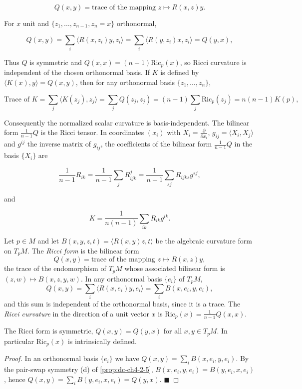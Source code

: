 $$
Q(x,y)=\text{trace of the mapping }z\mapsto R(x,z)y.
$$

For $x$ unit and $\{z_1,\dots,z_{n-1},z_n=x\}$ orthonormal,

$$
Q(x,y)=\sum_i\langle R(x,z_i)y,z_i\rangle=\sum_i\langle R(y,z_i)x,z_i\rangle=Q(y,x),
$$

Thus $Q$ is symmetric and $Q(x,x)=(n-1)\mathrm{Ric}_p(x)$, so Ricci curvature is
independent of the chosen orthonormal basis. If $K$ is defined by
$\langle K(x),y\rangle=Q(x,y)$, then for any orthonormal basis
$\{z_1,\dots,z_n\}$,

$$
\text{Trace of }K=\sum_j\langle K(z_j),z_j\rangle=\sum_j Q(z_j,z_j)=(n-1)\sum_j\mathrm{Ric}_p(z_j)=n(n-1)K(p),
$$

Consequently the normalized scalar curvature is basis-independent. The bilinear
form $\frac{1}{n-1}Q$ is the Ricci tensor. In coordinates $(x_i)$ with
$X_i=\frac{\partial}{\partial x_i}$, $g_{ij}=\langle X_i,X_j\rangle$ and $g^{ij}$
the inverse matrix of $g_{ij}$, the coefficients of the bilinear form
$\frac{1}{n-1}Q$ in the basis $\{X_i\}$ are

$$
\frac{1}{n-1}R_{ik}=\frac{1}{n-1}\sum_j R_{ijk}^j=\frac{1}{n-1}\sum_{sj}R_{ijks}g^{sj},
$$

and

$$
K=\frac{1}{n(n-1)}\sum_{ik}R_{ik}g^{ik}.
$$

\begin{definition}
  \label{def:dc-ch4-4-ricci-form}


  Let $p\in M$ and let $B(x,y,z,t)=\langle R(x,y)z,t\rangle$ be the algebraic
  curvature form on $T_pM$. The \emph{Ricci form} is the bilinear form
  $$
  Q(x,y)=\text{trace of the mapping }z\mapsto R(x,z)y,
  $$
  the trace of the endomorphism of $T_pM$ whose associated bilinear form is
  $(z,w)\mapsto B(x,z,y,w)$. In any orthonormal basis $\{e_i\}$ of $T_pM$,
  $$
  Q(x,y)=\sum_i\langle R(x,e_i)y,e_i\rangle=\sum_i B(x,e_i,y,e_i),
  $$
  and this sum is independent of the orthonormal basis, since it is a trace. The
  \emph{Ricci curvature} in the direction of a unit vector $x$ is
  $\mathrm{Ric}_p(x)=\frac{1}{n-1}Q(x,x)$.
\end{definition}

\begin{proposition}
  \label{prop:dc-ch4-4-ricci-symm}


  The Ricci form is symmetric, $Q(x,y)=Q(y,x)$ for all $x,y\in T_pM$. In
  particular $\mathrm{Ric}_p(x)$ is intrinsically defined.
\end{proposition}
\begin{proof}

  \sketch
  In an orthonormal basis $\{e_i\}$ we have $Q(x,y)=\sum_i B(x,e_i,y,e_i)$. By the
  pair-swap symmetry (d) of \cref{prop:dc-ch4-2-5}, $B(x,e_i,y,e_i)=B(y,e_i,x,e_i)$,
  hence $Q(x,y)=\sum_i B(y,e_i,x,e_i)=Q(y,x)$. $\blacksquare$
\end{proof}

